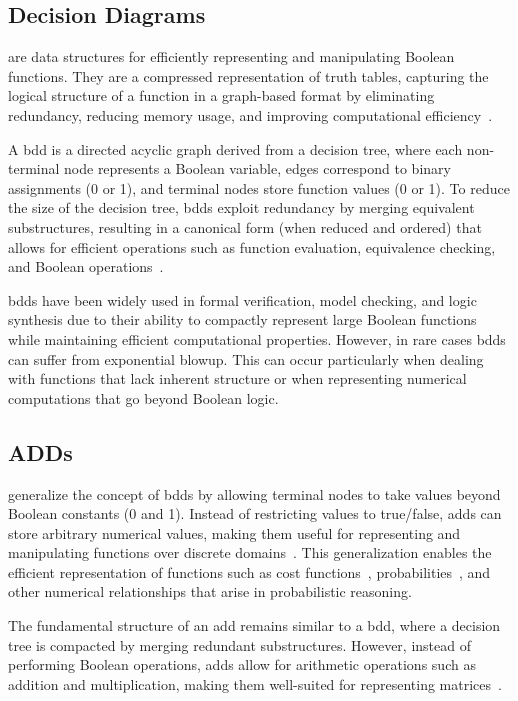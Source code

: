 \subsection{Decision Diagrams}\label{subsec:decision-diagrams}
 are data structures for efficiently representing and manipulating Boolean functions.
They are a compressed representation of truth tables, capturing the logical structure of a function in a graph-based format by eliminating redundancy, reducing memory usage, and improving computational efficiency~\cite{bryant1986graph}.

A \gls{bdd} is a directed acyclic graph derived from a decision tree, where each non-terminal node represents a Boolean variable, edges correspond to binary assignments (0 or 1), and terminal nodes store function values (0 or 1).
To reduce the size of the decision tree, \glspl{bdd} exploit redundancy by merging equivalent substructures, resulting in a canonical form (when reduced and ordered) that allows for efficient operations such as function evaluation, equivalence checking, and Boolean operations~\cite{bryant1986graph}.

\glspl{bdd} have been widely used in formal verification, model checking, and logic synthesis due to their ability to compactly represent large Boolean functions while maintaining efficient computational properties.
However, in rare cases \glspl{bdd} can suffer from exponential blowup. This can occur particularly when dealing with functions that lack inherent structure or when representing numerical computations that go beyond Boolean logic.

\subsection{ADDs}\label{subsec:adds}
 generalize the concept of \glspl{bdd} by allowing terminal nodes to take values beyond Boolean constants (0 and 1).
Instead of restricting values to true/false, \glspl{add} can store arbitrary numerical values, making them useful for representing and manipulating functions over discrete domains~\cite{bahar1997algebric}.
This generalization enables the efficient representation of functions such as cost functions~\cite{kwiatkowska2004probabilistic}, probabilities~\cite{baier1997symbolic}, and other numerical relationships that arise in probabilistic reasoning.

The fundamental structure of an \gls{add} remains similar to a \gls{bdd}, where a decision tree is compacted by merging redundant substructures.
However, instead of performing Boolean operations, \glspl{add} allow for arithmetic operations such as addition and multiplication, making them well-suited for representing matrices~\cite{bahar1997algebric}.